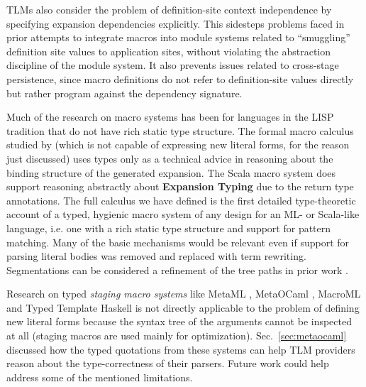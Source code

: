 \documentclass[acmsmall]{acmart}
\begin{document}
TLMs also consider the problem of definition-site context independence by specifying expansion dependencies explicitly. This sidesteps problems faced in prior attempts to integrate macros into module systems \cite{culpepper2005syntactic} related to ``smuggling'' definition site values to application sites, without violating the abstraction discipline of the module system. It also prevents issues related to cross-stage persistence, since macro definitions do not refer to definition-site values directly but rather program against the dependency signature.

Much of the research on macro systems has been for languages in the LISP tradition \cite{mccarthy1978history} that do not have rich static type structure. The formal macro calculus studied by \citet{DBLP:conf/esop/HermanW08} (which is not capable of expressing new literal forms, for the reason just discussed) uses types only as a technical advice in reasoning about the binding structure of the generated expansion. The Scala macro system does support reasoning abstractly about \textbf{Expansion Typing} due to the return type annotations. The full calculus we have defined is the first detailed type-theoretic account of a typed, hygienic macro system of any design for an ML- or Scala-like language, i.e. one with a rich static type structure and support for pattern matching. Many of the basic mechanisms would be relevant even if support for parsing literal bodies was removed and replaced with term rewriting. Segmentations can be considered a refinement of the tree paths in prior work \cite{Herman10:Theory,gorn1965explicit}.

Research on typed \emph{staging macro systems} \cite{DBLP:conf/popl/DaviesP96} like MetaML \cite{Sheard:1999:UMS}, MetaOCaml \cite{DBLP:conf/flops/Kiselyov14}, MacroML \cite{ganz2001macros,DBLP:conf/gpce/TahaJ03} and Typed Template Haskell \cite{tth} is not directly applicable to the problem of defining new literal forms because the syntax tree of the arguments cannot be inspected at all (staging macros are used mainly for optimization). Sec.~\ref{sec:metaocaml} discussed how the typed quotations from these systems can help TLM providers reason about the type-correctness of their parsers. Future work could help address some of the mentioned limitations.
\end{document}
